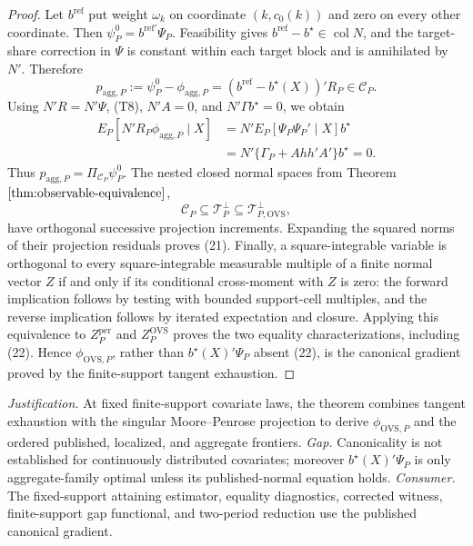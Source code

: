 \documentclass{article}
\begin{document}
\begin{proof}
Let \(b^{\mathrm{ref}}\) put weight \(\omega_k\) on coordinate \((k,c_0(k))\) and zero on every other coordinate.  Then \(\psi_P^0=b^{\mathrm{ref}\prime}\Psi_P\).  Feasibility gives \(b^{\mathrm{ref}}-b^\star\in\operatorname{col}N\), and the target-share correction in \(\Psi\) is constant within each target block and is annihilated by \(N'\).  Therefore
\[
p_{\mathrm{agg},P}:=\psi_P^0-\phi_{\mathrm{agg},P}
=(b^{\mathrm{ref}}-b^\star(X))'R_P\in\mathcal C_P.
\tag{T10}
\]
Using \(N'R=N'\Psi\), (T8), \(N'A=0\), and \(N'\Gamma b^\star=0\), we obtain
\[
\begin{aligned}
E_P[N'R_P\phi_{\mathrm{agg},P}\mid X]
&=N'E_P[\Psi_P\Psi_P'\mid X]b^\star\\
&=N'\{\Gamma_P+Ahh'A'\}b^\star=0.
\end{aligned}
\tag{T11}
\]
Thus \(p_{\mathrm{agg},P}=\Pi_{\mathcal C_P}\psi_P^0\).  The nested closed normal spaces from Theorem \(\ref{thm:observable-equivalence}\),
\[
\mathcal C_P\subseteq\mathcal T_P^\perp
\subseteq\mathcal T_{P,\mathrm{OVS}}^\perp,
\]
have orthogonal successive projection increments.  Expanding the squared norms of their projection residuals proves (21).  Finally, a square-integrable variable is orthogonal to every square-integrable measurable multiple of a finite normal vector \(Z\) if and only if its conditional cross-moment with \(Z\) is zero: the forward implication follows by testing with bounded support-cell multiples, and the reverse implication follows by iterated expectation and closure.  Applying this equivalence to \(Z_P^{\mathrm{per}}\) and \(Z_P^{\mathrm{OVS}}\) proves the two equality characterizations, including (22).  Hence \(\phi_{\mathrm{OVS},P}\), rather than \(b^\star(X)'\Psi_P\) absent (22), is the canonical gradient proved by the finite-support tangent exhaustion.
\end{proof}
\par\smallskip\noindent \textit{Justification.} At fixed finite-support covariate laws, the theorem combines tangent exhaustion with the singular Moore--Penrose projection to derive \(\phi_{\mathrm{OVS},P}\) and the ordered published, localized, and aggregate frontiers. \textit{Gap.} Canonicality is not established for continuously distributed covariates; moreover \(b^\star(X)'\Psi_P\) is only aggregate-family optimal unless its published-normal equation holds. \textit{Consumer.} The fixed-support attaining estimator, equality diagnostics, corrected witness, finite-support gap functional, and two-period reduction use the published canonical gradient.
\end{document}
